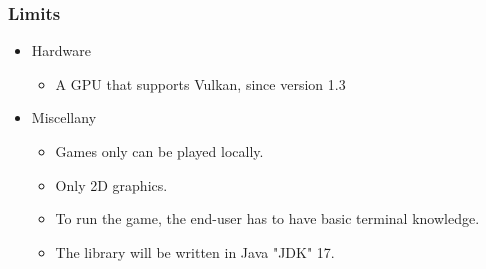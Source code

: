 \subsubsection{Limits}
\begin{itemize}
    \item Hardware
    \begin{itemize}
        \item A GPU that supports Vulkan, since version 1.3
    \end{itemize}
    \item Miscellany
    \begin{itemize}
        \item Games only can be played locally.
        \item Only 2D graphics.
        \item To run the game, the end-user has to have basic terminal knowledge.
        \item The library will be written in Java "JDK" 17.
    \end{itemize}
\end{itemize}
